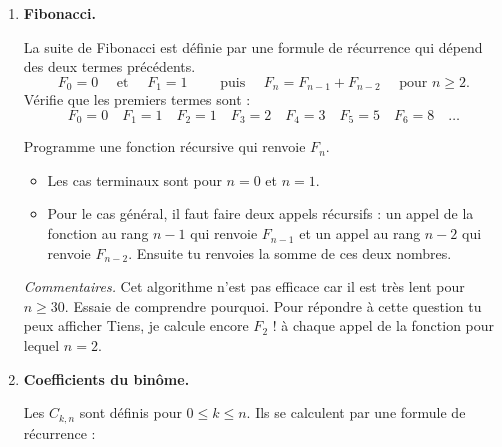 \documentclass[11pt,class=report,crop=false]{standalone}
\begin{document}
%
%
%



\begin{activite}
   

\begin{enumerate}
  \item \textbf{Fibonacci.}
  
  La suite de Fibonacci est définie par une formule de récurrence qui dépend des deux termes précédents.
  $$F_0 = 0 \quad\text{ et }\quad  F_1 = 1 \qquad \text{ puis } \quad F_{n} = F_{n-1} + F_{n-2} \quad \text{ pour } n\ge2.$$
  Vérifie que les premiers termes sont :
  $$F_0 = 0 \quad F_1 = 1 \quad F_2 = 1 \quad F_3 = 2 \quad F_4 = 3 \quad F_5 = 5  \quad F_6 = 8 \quad \ldots$$
  
  Programme une fonction récursive  qui renvoie $F_n$.
  \begin{itemize}
    \item Les cas terminaux sont pour $n=0$ et $n=1$.
    \item Pour le cas général, il faut faire deux appels récursifs : un appel de la fonction au rang $n-1$ qui renvoie $F_{n-1}$ et un appel au rang $n-2$ qui renvoie $F_{n-2}$. Ensuite tu renvoies la somme de ces deux nombres.
  \end{itemize}
    
   
  \emph{Commentaires.} Cet algorithme n'est pas efficace car il est très lent pour  $n\ge 30$. Essaie de comprendre pourquoi. Pour répondre à cette question tu peux afficher \og{}Tiens, je calcule encore $F_2$ !\fg{} à chaque appel de la fonction pour lequel $n=2$. 
  
    
  \item \textbf{Coefficients du binôme.}
  
  Les  $C_{k,n}$  sont définis pour $0 \le k \le n$.
  Ils se calculent par une formule de récurrence :
  

\end{enumerate}
\end{activite}
\end{document}
